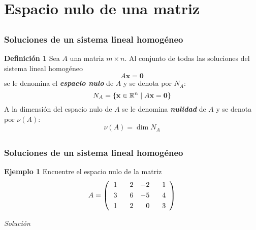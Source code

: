 \section{Espacio nulo de una matriz}

\subsection{}

\begin{frame}\frametitle{Soluciones de un sistema lineal homogéneo}

\begin{defi}{\textbf{Definición 1}}
	Sea $A$ una matriz $m\times n$. Al conjunto de todas las soluciones del sistema lineal
	homogéneo
	\[
		A \mathbf{x} =  \mathbf{0}
	\]
	se le denomina el \textbf{\textit{espacio nulo}} de $A$ y se denota por $N_A$:
	\[
    	N_A = \{ \mathbf{x}\in \mathbb{R}^n \mid A \mathbf{x} =  \mathbf{0} \}	
	\]
	A la dimensión del espacio nulo de $A$ se le denomina \textbf{\textit{nulidad}} de $A$ y se denota por $\nu(A)$:
	\[
		\nu(A) = \dim N_A
	\]
\end{defi}	


\end{frame}


\subsection{}

\begin{frame}\frametitle{Soluciones de un sistema lineal homogéneo}
			
	\begin{ej}{\textbf{Ejemplo 1}}
		Encuentre el espacio nulo de la matriz
		\[
		A = 
		\left( 
		\begin{array}{@{\hspace{\tabcolsep}}rrrr}	
		1 & \phantom{-}2 & -2 & \phantom{-}1 \\[1mm] 
		3 & 6 & -5 & 4 \\[1mm] 
		1 &  2 & 0 & 3
		\end{array} 
		\right)
		\]
	\end{ej}
	\textit{Solución}
	
\end{frame}


